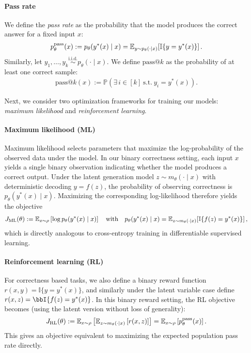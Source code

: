 \documentclass[10pt]{article} %
\begin{document}
\paragraph{Pass rate}
We define the \emph{pass rate} as the probability that the model produces the
correct answer for a fixed input $x$:
\begin{align*}
    p^{\mathrm{pass}}_{\theta}(x)
    := p_\theta(y^\ast(x)\mid x)
    = \mathbb{E}_{y \sim p_{\theta}(\cdot \mid x)}
    \!\left[\mathbb{I}\{y = y^\ast(x)\}\right].
\end{align*}
Similarly, let $y_1,\ldots,y_k \overset{\text{i.i.d.}}{\sim} p_\theta(\cdot\mid x)$.
We define $\text{pass@}k$ as the probability of at least one correct sample:
\begin{align*}
\text{pass@}k(x)
:= \mathbb{P}\!\left(\exists\, i \in [k]\ \text{s.t.}\ y_i = y^\ast(x)\right).
\end{align*}

Next, we consider two optimization frameworks for training our models: \textit{maximum likelihood} and \textit{reinforcement learning}.

\paragraph{Maximum likelihood (ML)}
Maximum likelihood selects parameters that maximize the log-probability of the
observed data under the model.
In our binary correctness setting, each input $x$ yields a single binary observation
indicating whether the model produces a correct output.
Under the latent generation model $z \sim m_\theta(\cdot \mid x)$ with deterministic
decoding $y = f(z)$, the probability of observing correctness is
$p_\theta(y^\ast(x)\mid x)$.
Maximizing the corresponding log-likelihood therefore yields the objective
\begin{align}\label{eq:maximum_likelihood}
    J_{\mathrm{ML}}(\theta)
    := \operatorname{\mathbb{E}}_{x \sim \rho}\left[\log p_\theta(y^\ast(x) \mid x) \right]
    \quad\text{with}\quad
    p_\theta(y^\ast(x)\mid x)
    = \operatorname{\mathbb{E}}_{z \sim m_\theta(\cdot\mid x)}\!\left[\mathbb{I}\{f(z)=y^\ast(x)\}\right],
\end{align}
which is directly analogous to cross-entropy training in differentiable supervised
learning.

    
\paragraph{Reinforcement learning (RL)} 
For correctness based tasks, we also define a binary reward function $r(x, y) = \mathbb{I}\{y = y^*(x)\}$, and similarly under the latent variable case define $r(x,z) = \bbI\crl*{f(z) = y^\ast(x)}$. In this binary reward setting, the RL objective becomes (using the latent version without loss of generality):
\begin{equation}\label{eq:rl_passrate}
    J_{\mathrm{RL}}(\theta) := \mathbb{E}_{x \sim \rho} \left[ \mathbb{E}_{z \sim m_\theta(\cdot|x)} \left[ r(x,z) \right] \right] = \mathbb{E}_{x \sim \rho} \left[ p^{\mathrm{pass}}_{\theta}(x) \right].
\end{equation}
This gives an objective equivalent to maximizing the expected population pass rate directly.
\end{document}
